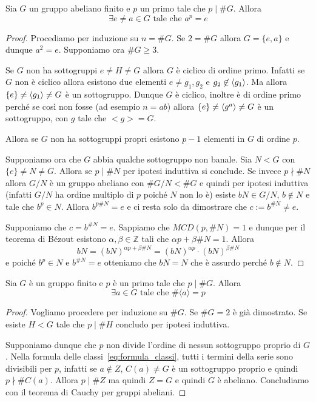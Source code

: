 \begin{theorem}
    Sia \(G\) un gruppo abeliano finito e \(p\) un primo tale che \(p \mid \# G\).
    Allora 
    \[
      \exists e\neq a \in G \text{ tale che } a^{p} = e
    \]
\end{theorem}
\begin{proof}
    Procediamo per induzione su \(n = \# G\).
    Se \(2 = \# G\) allora \(G = \{e, a\} \) e dunque \(a^2 = e\). Supponiamo
    ora \(\# G \ge 3\).

    Se \(G\) non ha sottogruppi \(e \neq H \neq G\) allora \(G\) è ciclico di
    ordine primo. Infatti se \(G\) non è ciclico allora esistono due elementi
    \(e\neq g_{1}, g_{2}\) e \(g_{2} \not\in {\left\langle g_{1}\right\rangle} \). Ma allora
    \(\{e\} \neq {\left\langle g_{1}\right\rangle} \neq G\) è un sottogruppo. Dunque \(G\) è
    ciclico, inoltre è di ordine primo perché se così non fosse (ad esempio \(n
    = ab\)) allora \(\{e\} \neq {\left\langle g^{a}\right\rangle} \neq G\) è un sottogruppo, con
    \(g\) tale che \(<g> = G\).

    Allora se \(G\) non ha sottogruppi propri esistono \(p-1\) elementi in \(G\)
    di ordine \(p\).

    Supponiamo ora che \(G\) abbia qualche sottogruppo non banale. Sia \(N < G\)
    con \(\{e\} \neq N \neq G\). Allora se \(p \mid \# N\) per ipotesi induttiva si
    conclude. Se invece \(p\nmid \# N\) allora \(G / N\) è un gruppo abeliano
    con \(\# G / N < \# G\) e quindi per ipotesi induttiva (infatti \(G/N\) ha
    ordine multiplo di \(p\) poiché \(N\) non lo è) esiste \(bN \in G/N\), \(b
    \not\in N\) e tale che \(b^{p} \in N\). Allora \(b^{p\#N} = e\) e ci resta
    solo da dimostrare che \(c := b^{\#N} \neq e\).

    Supponiamo che \(c = b^{\#N} = e\). Sappiamo che \(MCD(p, \#N) = 1\) e
    dunque per il teorema di Bézout esistono \(\alpha, \beta \in \mathbb{Z}\)
    tali che \(\alpha p + \beta \#N = 1\).
    Allora 
    \[
      bN = {(bN)}^{\alpha p + \beta\# N} = {(bN)}^{\alpha p} \cdot {(bN)}^{\beta
      \#N}
    \]
    e poiché \(b^{p} \in N\) e \(b^{\#N} = e\) otteniamo che \(bN = N\) che è
    assurdo perché \(b \not\in N\).
\end{proof}
\begin{theorem}[Cauchy]
    Sia \(G\) è un gruppo finito e \(p\) è un primo tale che \(p \mid \# G\).
    Allora
    \[
        \exists a \in G \text{ tale che } \# \langle a \rangle = p
    \]
\end{theorem}
\begin{proof}
    Vogliamo procedere per induzione su \(\#G\). Se \(\#G = 2\) è già
    dimostrato. Se esiste \(H < G\) tale che \(p \mid \# H\) concludo per ipotesi
    induttiva.

    Supponiamo dunque che \(p\) non divide l'ordine di nessun sottogruppo
    proprio di \(G\). Nella formula delle classi~\eqref{eq:formula_classi},
    tutti i termini della serie sono divisibili per \(p\), infatti se \(a
    \not\in Z\), \(C{(a)}\neq G\) è un sottogruppo proprio e quindi \(p \nmid
    \# C{(a)}\). Allora \(p \mid \# Z\) ma quindi \(Z = G\) e quindi \(G\) è
    abeliano. Concludiamo con il teorema di Cauchy per gruppi abeliani.
\end{proof}
